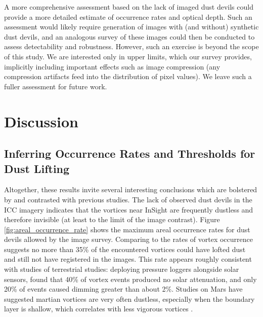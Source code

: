 \documentclass{aastex63}
\begin{document}
A more comprehensive assessment based on the lack of imaged dust devils could provide a more detailed estimate of occurrence rates and optical depth. Such an assessment would likely require generation of images with (and without) synthetic dust devils, and an analogous survey of these images could then be conducted to assess detectability and robustness. However, such an exercise is beyond the scope of this study. We are interested only in upper limits, which our survey provides, implicitly including important effects such as image compression (any compression artifacts feed into the distribution of pixel values). We leave such a fuller assessment for future work.

\section{Discussion}
\label{sec:Discussion}

\subsection{Inferring Occurrence Rates and Thresholds for Dust Lifting}
\label{sec:Inferring Occurrence Rates and Thresholds for Dust Lifting}

Altogether, these results invite several interesting conclusions which are bolstered by and contrasted with previous studies. The lack of observed dust devils in the ICC imagery indicates that the vortices near InSight are frequently dustless and therefore invisible (at least to the limit of the image contrast). Figure \ref{fig:areal_occurrence_rate} shows the maximum areal occurrence rates for dust devils allowed by the image survey. Comparing to the rates of vortex occurrence suggests no more than 35\% of the encountered vortices could have lofted dust and still not have registered in the images. This rate appears roughly consistent with studies of terrestrial studies: deploying pressure loggers alongside solar sensors, \citet{LORENZ20151} found that 40\% of vortex events produced no solar attenuation, and only 20\% of events caused dimming greater than about 2\%. Studies on Mars have suggested martian vortices are very often dustless, especially when the boundary layer is shallow, which correlates with less vigorous vortices \citep{2015Icar..249..129M, 2016Icar..278..180S}. 
\end{document}
